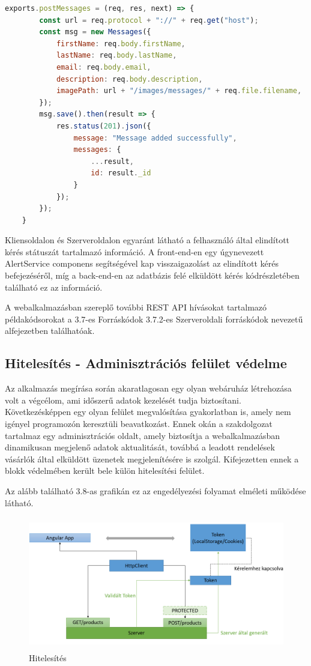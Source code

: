\begin{lstlisting}[language=JavaScript]
	exports.postMessages = (req, res, next) => {
		const url = req.protocol + "://" + req.get("host");
		const msg = new Messages({
			firstName: req.body.firstName,
			lastName: req.body.lastName,
			email: req.body.email,
			description: req.body.description,
			imagePath: url + "/images/messages/" + req.file.filename,
		});
		msg.save().then(result => {
			res.status(201).json({
				message: "Message added successfully",
				messages: {
					...result,
					id: result._id
				}
			});
		});
	}
\end{lstlisting}

Kliensoldalon és Szerveroldalon egyaránt látható a felhasználó által elindított kérés státuszát tartalmazó információ. A front-end-en egy úgynevezett AlertService componens segítségével kap visszaigazolást az elindított kérés befejezéséről, míg a back-end-en az adatbázis felé elküldött kérés kódrészletében található ez az információ.

\bigskip
A webalkalmazásban szereplő további REST API hívásokat tartalmazó példakódsorokat a 3.7-es Forráskódok 3.7.2-es Szerveroldali forráskódok nevezetű alfejezetben találhatóak.

\subsection{Hitelesítés - Adminisztrációs felület védelme}
Az alkalmazás megírása során akaratlagosan egy olyan webáruház létrehozása volt a végcélom, ami időszerű adatok kezelését tudja biztosítani. Következésképpen egy olyan felület megvalósítása gyakorlatban is, amely nem igényel programozón keresztüli beavatkozást. Ennek okán a szakdolgozat tartalmaz egy adminisztrációs oldalt, amely biztosítja a webalkalmazásban dinamikusan megjelenő adatok aktualitását, továbbá a leadott rendelések vásárlók által elküldött üzenetek megjelenítésére is szolgál. Kifejezetten ennek a blokk védelmében került bele külön hitelesítési felület.

\bigskip
Az alább található 3.8-as grafikán ez az engedélyezési folyamat elméleti működése látható.
 
\begin{figure}[H]
	\centering
	\includegraphics[width=1.0\textwidth,height=220px]{images/hitelesites_bemutatasa.png}
	\caption{Hitelesítés}
	\label{fig.picture-9}
\end{figure}

